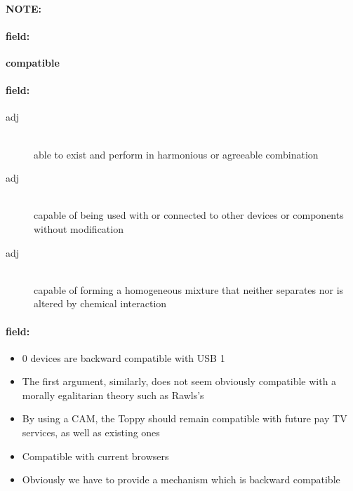 \documentclass[12pt]{article}
\newenvironment{note}{\paragraph{NOTE:}}{}
\newenvironment{field}{\paragraph{field:}}{}
\begin{document}
\begin{note}
\begin{field}
\textbf{\large compatible}
\end{field}


\begin{field}
\begin{description}
\item[adj] \hfill \\ 
able to exist and perform in harmonious or agreeable combination

\item[adj] \hfill \\ 
capable of being used with or connected to other devices or components without modification

\item[adj] \hfill \\ 
capable of forming a homogeneous mixture that neither separates nor is altered by chemical interaction

\end{description}
\end{field}

\begin{field}
\begin{itemize}
\item 0 devices are backward compatible with USB 1
\item The first argument, similarly, does not seem obviously compatible with a morally egalitarian theory such as Rawls's
\item By using a CAM, the Toppy should remain compatible with future pay TV services, as well as existing ones
\item Compatible with current browsers
\item Obviously we have to provide a mechanism which is backward compatible
\end{itemize}
\end{field}
\end{note}
\end{document}
